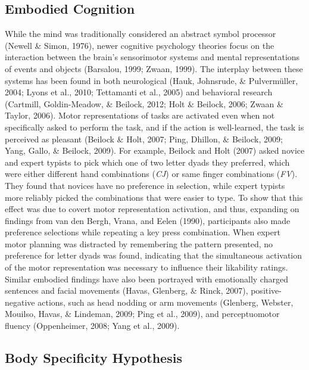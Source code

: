 \documentclass[english,man, mask]{apa6}
\theoremstyle{definition}
\theoremstyle{definition}
\theoremstyle{definition}
\theoremstyle{remark}
\begin{document}
\subsection{Embodied Cognition}\label{embodied-cognition}

While the mind was traditionally considered an abstract symbol processor
(Newell \& Simon, 1976), newer cognitive psychology theories focus on
the interaction between the brain's sensorimotor systems and mental
representations of events and objects (Barsalou, 1999; Zwaan, 1999). The
interplay between these systems has been found in both neurological
(Hauk, Johnsrude, \& Pulvermüller, 2004; Lyons et al., 2010; Tettamanti
et al., 2005) and behavioral research (Cartmill, Goldin-Meadow, \&
Beilock, 2012; Holt \& Beilock, 2006; Zwaan \& Taylor, 2006). Motor
representations of tasks are activated even when not specifically asked
to perform the task, and if the action is well-learned, the task is
perceived as pleasant (Beilock \& Holt, 2007; Ping, Dhillon, \& Beilock,
2009; Yang, Gallo, \& Beilock, 2009). For example, Beilock and Holt
(2007) asked novice and expert typists to pick which one of two letter
dyads they preferred, which were either different hand combinations
(\emph{CJ}) or same finger combinations (\emph{FV}). They found that
novices have no preference in selection, while expert typists more
reliably picked the combinations that were easier to type. To show that
this effect was due to covert motor representation activation, and thus,
expanding on findings from van den Bergh, Vrana, and Eelen (1990),
participants also made preference selections while repeating a key press
combination. When expert motor planning was distracted by remembering
the pattern presented, no preference for letter dyads was found,
indicating that the simultaneous activation of the motor representation
was necessary to influence their likability ratings. Similar embodied
findings have also been portrayed with emotionally charged sentences and
facial movements (Havas, Glenberg, \& Rinck, 2007), positive-negative
actions, such as head nodding or arm movements (Glenberg, Webster,
Mouilso, Havas, \& Lindeman, 2009; Ping et al., 2009), and
perceptuomotor fluency (Oppenheimer, 2008; Yang et al., 2009).

\subsection{Body Specificity
Hypothesis}\label{body-specificity-hypothesis}
\end{document}
